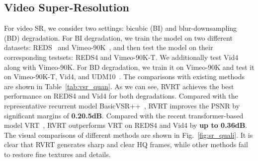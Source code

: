 \documentclass{article}
\newlength \g
\begin{document}
\subsection{Video Super-Resolution}
For video SR, we consider two settings: bicubic (BI) and blur-downsampling (BD) degradation. For BI degradation, we train the model on two different datasets: REDS~\cite{nah2019ntireREDS} and Vimeo-90K~\cite{xue2019TOFlow-Vimeo-90K}, and then test the model on their corresponding testsets: REDS4 and Vimeo-90K-T. We additionally test Vid4~\cite{liu2013bayesianVid4} along with Vimeo-90K. For BD degradation, we train it on Vimeo-90K and test it on Vimeo-90K-T, Vid4, and UDM10~\cite{yi2019pfnl_udm}. The comparisons with existing methods are shown in Table~\ref{tab:vsr_quan}. As we can see, RVRT achieves the best performance on REDS4 and Vid4 for both degradations. Compared with the representative recurrent model BasicVSR++~\cite{chan2021basicvsr++}, RVRT improves the PSNR by significant margins of \textbf{0.20.5dB}. Compared with the recent transformer-based model VRT~\cite{liang2022vrt}, RVRT outperforms VRT on REDS4 and Vid4 by \textbf{up to 0.36dB}. The visual comparisons of different methods are shown in Fig.~\ref{fig:sr_quali}. It is clear that RVRT generates sharp and clear HQ frames, while other methods fail to restore fine textures and details. 
\end{document}
